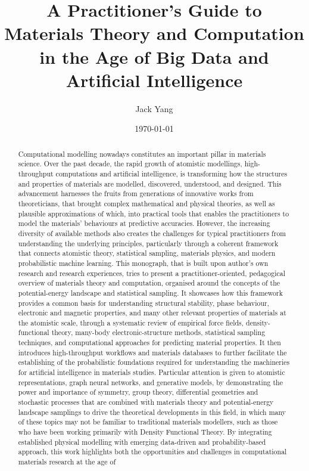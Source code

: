 \documentclass[%
aip,
rmp,
10pt, 
amsmath,
amssymb,
floatfix,
nofootinbib,
]{revtex4-2}
\begin{document}
\singlespacing



\title{A Practitioner's Guide to Materials Theory and Computation in the Age of Big Data and Artificial Intelligence}

\author{Jack Yang}


\date{\today}

\begin{abstract}
Computational modelling nowadays constitutes an important pillar in materials science. Over the past decade, the rapid growth of atomistic modellings, high-throughput computations and artificial intelligence, is transforming how the structures and  properties of materials are modelled, discovered, understood, and designed. This advancement harnesses the fruits from generations of innovative works from theoreticians, that brought complex mathematical and physical theories, as well as plausible approximations of which, into practical tools that enables the practitioners to model the materials' behaviours at predictive accuracies. However, the increasing diversity of available methods also creates the challenges for typical practitioners from understanding the underlying principles, particularly through a coherent framework that connects atomistic theory, statistical sampling, materials physics, and modern probabilistic machine learning. This monograph, that is built upon author's own research and research experiences, tries to  present a practitioner-oriented, pedagogical overview of materials theory and computation, organised around the concepts of the potential-energy landscape and statistical sampling. It showcases how this framework provides a common basis for understanding structural stability, phase behaviour, electronic and magnetic properties, and many other relevant properties of materials at the atomistic scale, through a systematic review of empirical force fields, density-functional theory, many-body electronic-structure methods, statistical sampling techniques, and computational approaches for predicting material properties. It then introduces high-throughput workflows and materials databases to further facilitate the establishing of  the probabilistic foundations required for understanding the machineries for artificial intelligence in materials studies. Particular attention is given to atomistic representations, graph neural networks, and generative models, by demonstrating the power and importance of symmetry, group theory, differential geometries and stochastic processes that are combined with materials theory and potential-energy landscape samplings to drive the theoretical developments in this field, in which many of these topics may not be familiar to traditional materials modellers, such as those who have been working primarily with Density Functional Theory. By integrating established physical modelling with emerging data-driven and probability-based approach, this work highlights both the opportunities and challenges  in computational materials research at the age of 
\end{abstract}
\end{document}
